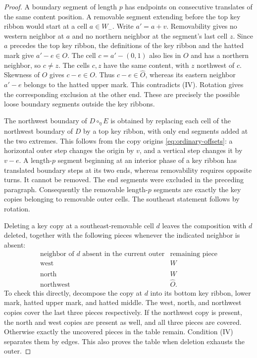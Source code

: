 \documentclass[11pt,a4paper]{amsart}
\numberwithin{equation}{section}
\theoremstyle{plain}
\theoremstyle{definition}
\begin{document}
\begin{proof}
A boundary segment of length \(p\) has endpoints on consecutive translates of the same content position.  A removable segment extending before the top key ribbon would start at a cell \(a\in W_-\).  Write \(a'=a+v\).  Removability gives no western neighbor at \(a\) and no northern neighbor at the segment's last cell \(z\).  Since \(a\) precedes the top key ribbon, the definitions of the key ribbon and the hatted mark give \(a'-e\in O\).  The cell \(c=a'-(0,1)\) also lies in \(O\) and has a northern neighbor, so \(c\ne z\).  The cells \(c,z\) have the same content, with \(z\) northwest of \(c\).  Skewness of \(O\) gives \(c-e\in O\).  Thus \(c-e\in\widehat O\), whereas its eastern neighbor \(a'-e\) belongs to the hatted upper mark.  This contradicts (IV).  Rotation gives the corresponding exclusion at the other end.  These are precisely the possible loose boundary segments outside the key ribbons.

The northwest boundary of \(D\circ_\eta E\) is obtained by replacing each cell of the northwest boundary of \(D\) by a top key ribbon, with only end segments added at the two extremes.  This follows from the copy origins \eqref{eq:ordinary-offsets}: a horizontal outer step changes the origin by \(v\), and a vertical step changes it by \(v-e\).  A length-\(p\) segment beginning at an interior phase of a key ribbon has translated boundary steps at its two ends, whereas removability requires opposite turns.  It cannot be removed.  The end segments were excluded in the preceding paragraph.  Consequently the removable length-\(p\) segments are exactly the key copies belonging to removable outer cells.  The southeast statement follows by rotation.

Deleting a key copy at a southeast-removable cell \(d\) leaves the composition with \(d\) deleted, together with the following pieces whenever the indicated neighbor is absent:
\begin{equation*}
 \begin{array}{c|c}
 \text{neighbor of }d\text{ absent in the current outer}&\text{remaining piece}\\ \hline
 \text{west}&W\\
 \text{north}&\widehat W\\
 \text{northwest}&\widehat O.
 \end{array}
\end{equation*}
To check this directly, decompose the copy at \(d\) into its bottom key ribbon, lower mark, hatted upper mark, and hatted middle.  The west, north, and northwest copies cover the last three pieces respectively.  If the northwest copy is present, the north and west copies are present as well, and all three pieces are covered.  Otherwise exactly the uncovered pieces in the table remain.  Condition (IV) separates them by edges.  This also proves the table when deletion exhausts the outer.


\end{proof}
\end{document}
